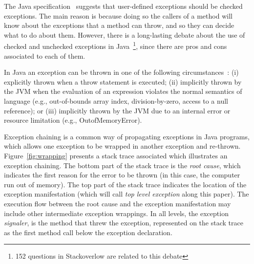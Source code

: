\documentclass[conference]{IEEEtran}
\begin{document}
The Java specification~\cite{gosling2000java} suggests that user-defined
exceptions should be checked exceptions. The main reason is because doing so the
callers of a method will know about the exceptions that a method can throw, and
so they can decide what to do about them. However, there is a long-lasting
debate about the use of checked and unchecked exceptions in
Java~\cite{javatut,stackoverlow,debate}\footnote{152 questions in Stackoverlow
are related to this debate}, since there are pros and cons associated to each of
them.


In Java an exception can be thrown in one of the following
circumstances~\cite{gosling2000java}: (i) explicitly thrown when a throw statement is executed; 
(ii) implicitly thrown by the JVM when the evaluation of an expression
 violates the normal semantics of language (e.g., out-of-bounds array index,
division-by-zero, access to a null reference); or (iii) implicitly thrown by
the JVM due to an internal error or resource limitation (e.g.,
OutofMemoryError). 




Exception chaining is a common way of propagating exceptions in Java programs, 
which allows one exception to be wrapped in another exception and re-thrown. 
Figure~\ref{fig:wrapping} presents a stack trace associated which illustrates an
exception chaining. The bottom part of the stack trace is the \emph{root cause}, which indicates the
first reason for the error to be thrown (in this case, the computer run out of
memory). The top part of the stack trace indicates the location of the exception
manifestation (which will call \emph{top level exception} along this paper). The
execution flow  between the root cause and the exception manifestation may
include other intermediate exception wrappings. In all levels, the exception
\emph{signaler}, is the method that threw the exception, represented on the
stack trace as the first method call below the exception declaration.
\end{document}
